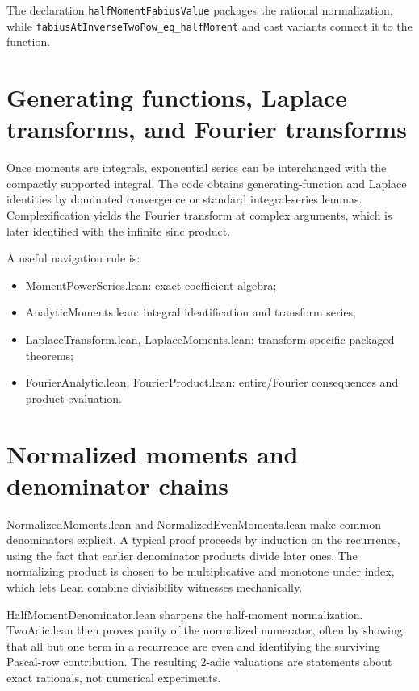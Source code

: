 \documentclass[11pt,a4paper,openany]{book}
\def\module#1{#1.lean}
\newcommand{\module}[1]{\nolinkurl{#1.lean}}
\newcommand{\pathbreak}[1]{\nolinkurl{#1}}
\begin{document}
The declaration \pathbreak{halfMomentFabiusValue} packages the rational normalization,
while \pathbreak{fabiusAtInverseTwoPow_eq_halfMoment} and cast variants connect it to
the function.

\section{Generating functions, Laplace transforms, and Fourier transforms}
Once moments are integrals, exponential series can be interchanged with the
compactly supported integral.  The code obtains generating-function and
Laplace identities by dominated convergence or standard integral-series
lemmas.  Complexification yields the Fourier transform at complex arguments,
which is later identified with the infinite sinc product.

A useful navigation rule is:
\begin{itemize}
  \item \module{MomentPowerSeries}: exact coefficient algebra;
  \item \module{AnalyticMoments}: integral identification and transform series;
  \item \module{LaplaceTransform}, \module{LaplaceMoments}: transform-specific
        packaged theorems;
  \item \module{FourierAnalytic}, \module{FourierProduct}: entire/Fourier
        consequences and product evaluation.
\end{itemize}

\section{Normalized moments and denominator chains}
\module{NormalizedMoments} and \module{NormalizedEvenMoments} make common
denominators explicit.  A typical proof proceeds by induction on the recurrence,
using the fact that earlier denominator products divide later ones.  The
normalizing product is chosen to be multiplicative and monotone under index,
which lets Lean combine divisibility witnesses mechanically.

\module{HalfMomentDenominator} sharpens the half-moment normalization.
\module{TwoAdic} then proves parity of the normalized numerator, often by
showing that all but one term in a recurrence are even and identifying the
surviving Pascal-row contribution.  The resulting $2$-adic valuations are
statements about exact rationals, not numerical experiments.

\end{document}
